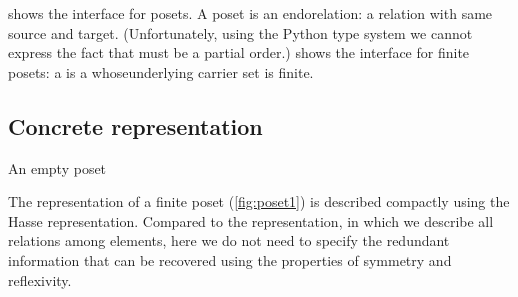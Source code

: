 
 shows the interface for posets. 
A poset is an endorelation: a relation with same source and target.
(Unfortunately, using the Python type system we cannot express the fact that  must be a partial order.)
 shows the interface for finite posets:
a  is a  whoseunderlying carrier set is finite.





\begin{figure}[h!]
    \caption{}
    \label{fig:poset-finiteposet}
\end{figure}

\subsection{Concrete representation}
\begin{marginfigure}
    \caption{}
    \label{fig:poset1}
\end{marginfigure}
\begin{marginfigure}
    \caption{An empty poset}
    \label{fig:poset_empty}
\end{marginfigure}

The representation of a finite poset (\cref{fig:poset1}) is described compactly using the Hasse representation.
Compared to the  representation, in which we describe all relations among elements, here we do not need to specify the redundant information that can be recovered using the properties of symmetry and reflexivity.


